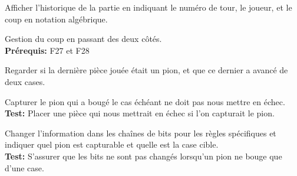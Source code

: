 \documentclass{article}
\begin{document}
\begin{needbox}
    Afficher l'historique de la partie en indiquant le numéro de tour, le joueur, et le coup en notation algébrique.
\end{needbox}

\begin{needbox}
    Gestion du coup en passant des deux côtés.\\
    \textbf{Prérequis:} F27 et F28
    \begin{subneedbox}
        Regarder si la dernière pièce jouée était un pion, et que ce dernier a avancé de deux cases.
    \end{subneedbox}
    \begin{subneedbox}
        Capturer le pion qui a bougé le cas échéant ne doit pas nous mettre en échec.\\
        \textbf{Test:} Placer une pièce qui nous mettrait en échec si l'on capturait le pion.
    \end{subneedbox}
    \begin{subneedbox}
        Changer l'information dans les chaînes de bits pour les règles spécifiques et indiquer quel pion
        est capturable et quelle est la case cible.\\
        \textbf{Test:} S'assurer que les bits ne sont pas changés lorsqu'un pion ne bouge que d'une case.
    \end{subneedbox}
\end{needbox}
\end{document}
